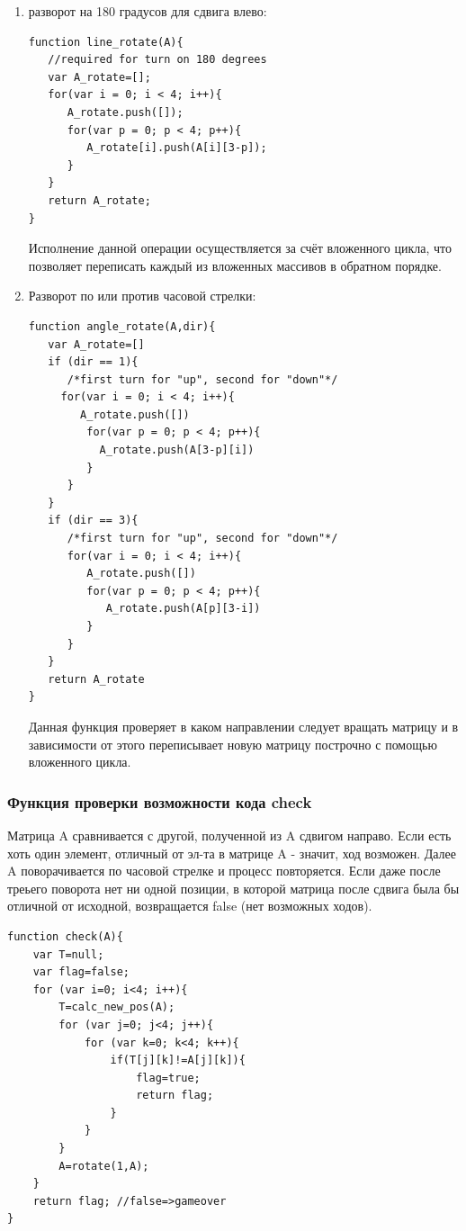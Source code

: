 \documentclass[a4paper,12pt]{article}
\begin{document}
\begin{enumerate}
\item{} разворот на 180 градусов для сдвига влево:\\

\begin{lstlisting}
function line_rotate(A){
   //required for turn on 180 degrees
   var A_rotate=[];
   for(var i = 0; i < 4; i++){
      A_rotate.push([]);
      for(var p = 0; p < 4; p++){
         A_rotate[i].push(A[i][3-p]);
      }
   }
   return A_rotate;
}
\end{lstlisting}
Исполнение данной операции осуществляется за счёт вложенного цикла, что позволяет переписать каждый из вложенных массивов в обратном порядке.

\item{} Разворот по или против часовой стрелки:\\
\begin{lstlisting}
function angle_rotate(A,dir){
   var A_rotate=[]
   if (dir == 1){
      /*first turn for "up", second for "down"*/
     for(var i = 0; i < 4; i++){
        A_rotate.push([])
         for(var p = 0; p < 4; p++){
           A_rotate.push(A[3-p][i])
         }
      }
   }
   if (dir == 3){ 
      /*first turn for "up", second for "down"*/
      for(var i = 0; i < 4; i++){
         A_rotate.push([])
         for(var p = 0; p < 4; p++){
            A_rotate.push(A[p][3-i])
         }
      }
   }
   return A_rotate
}
\end{lstlisting}
Данная функция проверяет в каком направлении следует вращать матрицу и в зависимости от этого переписывает новую матрицу построчно с помощью вложенного цикла.
\end{enumerate}
\subsubsection{Функция проверки возможности кода check}
Матрица A сравнивается с другой, полученной из A сдвигом направо. Если есть хоть один элемент, отличный от эл-та в матрице A - значит, ход возможен. Далее A поворачивается по часовой стрелке и процесс повторяется. Если даже после треьего поворота нет ни одной позиции, в которой матрица после сдвига была бы отличной от исходной, возвращается false (нет возможных ходов).\\
\begin{lstlisting}
function check(A){
	var T=null;
	var flag=false;
	for (var i=0; i<4; i++){
		T=calc_new_pos(A);
		for (var j=0; j<4; j++){
			for (var k=0; k<4; k++){
				if(T[j][k]!=A[j][k]){
					flag=true;
					return flag;
				}
			}
		}
		A=rotate(1,A);
	}
	return flag; //false=>gameover
}
\end{lstlisting}
\end{document}
